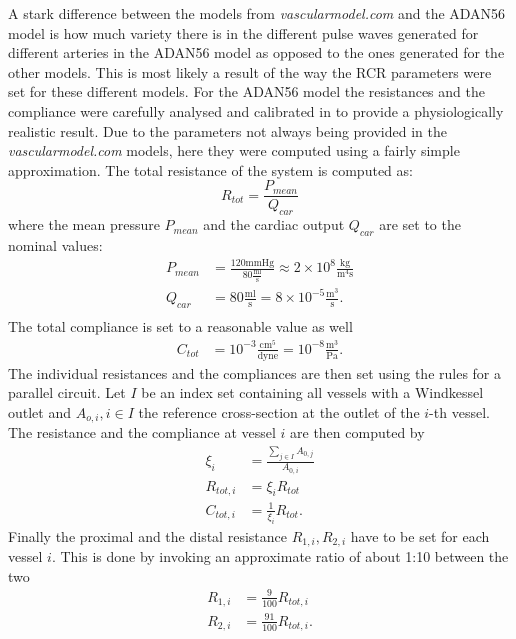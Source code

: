 \documentclass[a4paper, oneside]{discothesis}
\begin{document}
A stark difference between the models from \emph{vascularmodel.com} and the ADAN56 model is how much variety there is in the different pulse waves generated for different arteries in the ADAN56 model as opposed to the ones generated for the other models.
This is most likely a result of the way the RCR parameters were set for these different models.
For the ADAN56 model the resistances and the compliance were carefully analysed and calibrated in \cite{blanco2014anatomically,blanco2014blood} to provide a physiologically realistic result.
Due to the parameters not always being provided in the \emph{vascularmodel.com} models, here they were computed using a fairly simple approximation.
The total resistance of the system is computed as:
\begin{equation}
	R_{tot} = \frac{P_{mean}}{Q_{car}}
\end{equation}
where the mean pressure $P_{mean}$ and the cardiac output $Q_{car}$ are set to the nominal values:
\begin{align}
	P_{mean} &= \frac{120 \text{mmHg}}{80 \frac{\text{ml}}{\text{s}}} \approx 2 \times 10^8 \frac{\text{kg}}{\text{m}^4\text{s}} \\
	Q_{car} &= 80 \frac{\text{ml}}{\text{s}} = 8 \times 10^{-5} \frac{\text{m}^3}{\text{s}}. \\
\end{align}
The total compliance is set to a reasonable value as well
\begin{align}
	C_{tot} &= 10^{-3} \frac{\text{cm}^5}{\text{dyne}} = 10^{-8} \frac{\text{m}^3}{\text{Pa}}.
\end{align}
The individual resistances and the compliances are then set using the rules for a parallel circuit.
Let $I$ be an index set containing all vessels with a Windkessel outlet and $A_{o,i}, i \in I$ the reference cross-section at the outlet of the $i$-th vessel.
The resistance and the compliance at vessel $i$ are then computed by
\begin{align}
	\xi_i &= \frac{\sum_{j \in I} A_{0,j}}{A_{0,i}} \\
	R_{tot,i} &= \xi_i R_{tot} \\
	C_{tot,i} &= \frac{1}{\xi_i} R_{tot}. 
\end{align}
Finally the proximal and the distal resistance $R_{1,i}, R_{2,i}$ have to be set for each vessel $i$.
This is done by invoking an approximate ratio of about 1:10 between the two
\begin{align}
	R_{1,i} &= \frac{9}{100} R_{tot,i} \\
	R_{2,i} &= \frac{91}{100} R_{tot,i}.
\end{align}
\end{document}
